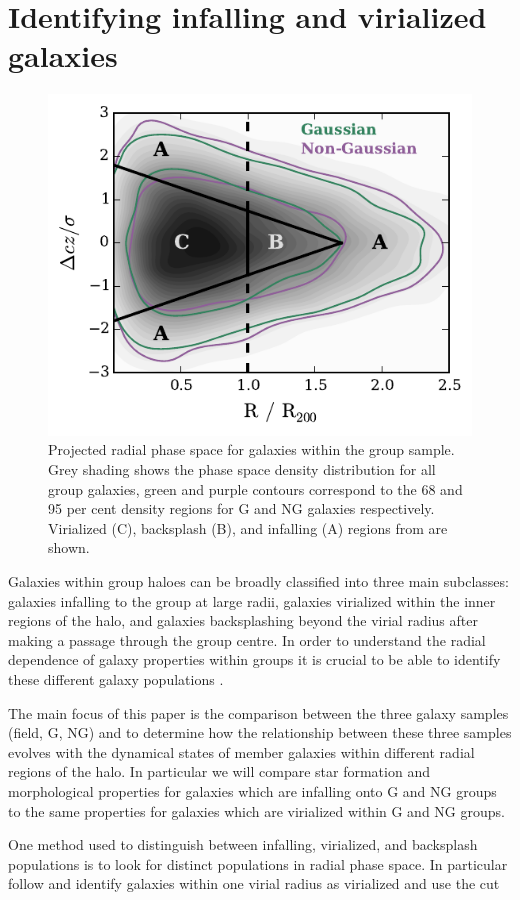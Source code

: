 \documentclass[a4paper,fleqn,usenatbib]{mnras}
\begin{document}

\section{Identifying infalling and virialized galaxies}
\label{sec:rad_div}

\begin{figure}
  \centering
  \includegraphics[width=\columnwidth]{vnorm_r_con.pdf}
  \caption{Projected radial phase space
    for galaxies within the group sample.  Grey shading shows the phase
    space density distribution for all group galaxies, green and
    purple contours correspond to the 68 and 95 per cent density
    regions for G and NG galaxies respectively. Virialized (C),
    backsplash (B), and infalling (A) regions from
    \citet{mahajan2011} are shown.}
  \label{fig:vnorm_r}
\end{figure}

Galaxies within group haloes can be broadly classified into three main
subclasses: galaxies infalling to the group at large radii, galaxies
virialized within the inner regions of the halo, and galaxies
backsplashing beyond the virial radius after making a passage through
the group centre.  In order to understand the radial dependence of
galaxy properties within groups it is crucial to be able to
identify these different galaxy populations
\citep{gill2005, mahajan2011, pimbblet2011, haines2015, noble2016}.
\par
The main focus of this paper is the comparison between the three
galaxy samples (field, G, NG) and to determine how the relationship
between these three samples evolves with the dynamical
states of member galaxies within different radial regions of the halo.
In particular we will compare star formation and
morphological properties for galaxies which are infalling onto G and
NG groups to the same properties for galaxies which are virialized
within G and NG groups.
\par
One method used to distinguish between infalling, virialized, and
backsplash populations is to look for distinct populations in radial
phase space.  In particular \citet{mahajan2011} follow
\citet{sanchis2004} and identify galaxies within one virial radius as
virialized and use the cut
\end{document}
